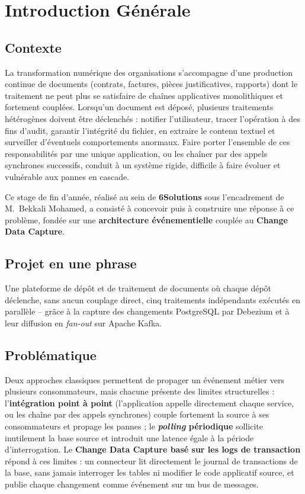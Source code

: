 \documentclass[12pt,a4paper,openany]{report}
\begin{document}
    \chapter{Introduction G\'en\'erale}

    \section{Contexte}

    La transformation num\'erique des organisations s'accompagne d'une production continue de documents (contrats, factures, pi\`eces justificatives, rapports) dont le traitement ne peut plus se satisfaire de cha\^ines applicatives monolithiques et fortement coupl\'ees. Lorsqu'un document est d\'epos\'e, plusieurs traitements h\'et\'erog\`enes doivent \^etre d\'eclench\'es : notifier l'utilisateur, tracer l'op\'eration \`a des fins d'audit, garantir l'int\'egrit\'e du fichier, en extraire le contenu textuel et surveiller d'\'eventuels comportements anormaux. Faire porter l'ensemble de ces responsabilit\'es par une unique application, ou les cha\^iner par des appels synchrones successifs, conduit \`a un syst\`eme rigide, difficile \`a faire \'evoluer et vuln\'erable aux pannes en cascade.

    Ce stage de fin d'ann\'ee, r\'ealis\'e au sein de \textbf{6Solutions} sous l'encadrement de M.~Bekkali Mohamed, a consist\'e \`a concevoir puis \`a construire une r\'eponse \`a ce probl\`eme, fond\'ee sur une \textbf{architecture \'ev\'enementielle} coupl\'ee au \textbf{Change Data Capture}.

    \section{Projet en une phrase}

    Une plateforme de d\'ep\^ot et de traitement de documents o\`u chaque d\'ep\^ot d\'eclenche, sans aucun couplage direct, cinq traitements ind\'ependants ex\'ecut\'es en parall\`ele -- gr\^ace \`a la capture des changements PostgreSQL par Debezium et \`a leur diffusion en \emph{fan-out} sur Apache Kafka.

    \section{Probl\'ematique}

    Deux approches classiques permettent de propager un \'ev\'enement m\'etier vers plusieurs consommateurs, mais chacune pr\'esente des limites structurelles : l'\textbf{int\'egration point \`a point} (l'application appelle directement chaque service, ou les cha\^ine par des appels synchrones) couple fortement la source \`a ses consommateurs et propage les pannes ; le \textbf{\emph{polling} p\'eriodique} sollicite inutilement la base source et introduit une latence \'egale \`a la p\'eriode d'interrogation. Le \textbf{Change Data Capture bas\'e sur les logs de transaction} r\'epond \`a ces limites : un connecteur lit directement le journal de transactions de la base, sans jamais interroger les tables ni modifier le code applicatif source, et publie chaque changement comme \'ev\'enement sur un bus de messages.
\end{document}
